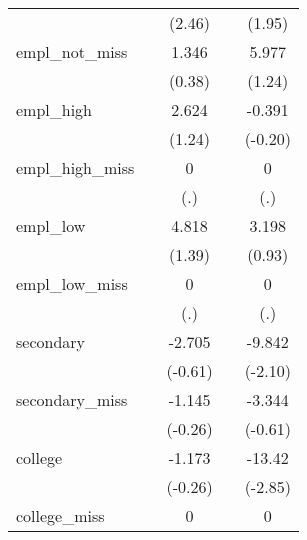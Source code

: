 {\begin{tabular}{l*{4}{c}}
            &                     &      (2.46)         &                     &      (1.95)         \\
[1em]
empl\_not\_miss&                     &       1.346         &                     &       5.977         \\
            &                     &      (0.38)         &                     &      (1.24)         \\
[1em]
empl\_high   &                     &       2.624         &                     &      -0.391         \\
            &                     &      (1.24)         &                     &     (-0.20)         \\
[1em]
empl\_high\_miss&                     &           0         &                     &           0         \\
            &                     &         (.)         &                     &         (.)         \\
[1em]
empl\_low    &                     &       4.818         &                     &       3.198         \\
            &                     &      (1.39)         &                     &      (0.93)         \\
[1em]
empl\_low\_miss&                     &           0         &                     &           0         \\
            &                     &         (.)         &                     &         (.)         \\
[1em]
secondary   &                     &      -2.705         &                     &      -9.842\sym{*}  \\
            &                     &     (-0.61)         &                     &     (-2.10)         \\
[1em]
secondary\_miss&                     &      -1.145         &                     &      -3.344         \\
            &                     &     (-0.26)         &                     &     (-0.61)         \\
[1em]
college     &                     &      -1.173         &                     &      -13.42\sym{**} \\
            &                     &     (-0.26)         &                     &     (-2.85)         \\
[1em]
college\_miss&                     &           0         &                     &           0         \\

\end{tabular}}
